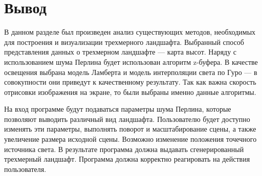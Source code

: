 \begin{figure}[H]
\end{figure}

\begin{figure}[H]
\end{figure}

\section{Вывод}
В данном разделе был произведен анализ существующих методов, необходимых для построения и визуализации трехмерного ландшафта. Выбранный способ представления данных о трехмерном ландшафте — карта высот. Наряду с использованием шума Перлина будет использован алгоритм z-буфера. В качестве освещения выбрана модель Ламберта и модель интерполяции света по Гуро — в совокупности они приведут к качественному результату. Так как важна скорость отрисовки изображения на экране, то были выбраны именно данные алгоритмы.

На вход программе будут подаваться параметры шума Перлина, которые позволяют выводить различный вид ландшафта. Пользователю будет доступно изменять эти параметры, выполнять поворот и масштабирование сцены, а также увеличение размера исходной сцены. Возможно изменение положения точечного источника света. В результате программа должна выдавать сгенерированный трехмерный ландшафт. Программа должна корректно реагировать на действия пользователя.